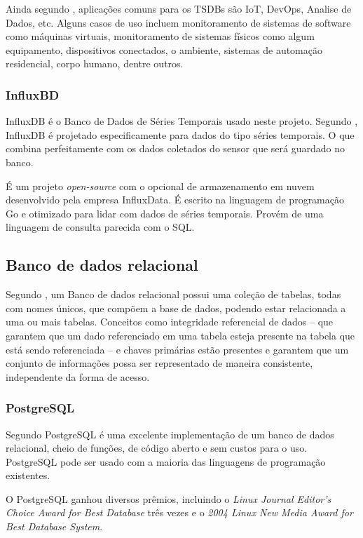 Ainda segundo \cite{Noor2017}, aplicações comuns para os TSDBs são IoT, DevOps, Analise de Dados, etc. Alguns casos de uso incluem monitoramento de sistemas de software como máquinas virtuais, monitoramento de sistemas físicos como algum equipamento, dispositivos conectados, o ambiente, sistemas de automação residencial, corpo humano, dentre outros.

\subsubsection{InfluxBD}

InfluxDB é o Banco de Dados de Séries Temporais usado neste projeto. Segundo \cite{Lundrigan2017}, InfluxDB é projetado especificamente para dados do tipo séries temporais. O que combina perfeitamente com os dados coletados do sensor que será guardado no banco.

É um projeto \textit{open-source} com o opcional de armazenamento em nuvem desenvolvido pela empresa InfluxData. É escrito na linguagem de programação Go e otimizado para lidar com dados de séries temporais. Provém de uma linguagem de consulta parecida com o SQL. \cite{Noor2017}

\subsection{Banco de dados relacional}

Segundo \cite{bancosrelacionais}, um Banco de dados relacional possui uma coleção de tabelas, todas com nomes únicos, que compõem a base de
dados, podendo estar relacionada a uma ou mais tabelas. Conceitos como integridade referencial de dados – que garantem que um dado referenciado em uma tabela esteja presente na tabela que está sendo referenciada – e chaves primárias estão presentes e garantem que um conjunto de informações possa ser representado de maneira consistente, independente da forma de acesso.

\subsubsection{PostgreSQL}

Segundo \cite{stones2006beginning} PostgreSQL é uma excelente implementação de um banco de dados relacional, cheio de funções, de código aberto e sem custos para o uso.
PostgreSQL pode ser usado com a maioria das linguagens de programação existentes.

O PostgreSQL ganhou diversos prêmios, incluindo o \textit{Linux Journal Editor's Choice Award for Best Database} três vezes e o \textit{2004 Linux New Media Award for Best Database System}.

